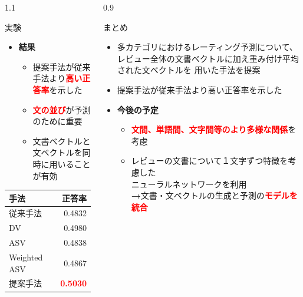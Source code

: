 \documentclass[unicode,10pt]{beamer}
\newlength{\mycolumnwidth}
\newcommand{\arrow}{\textcolor{ttiblue}{\textbf{→}}\hspace{1ex}}
\newcommand{\itemtitle}[1]{\textbf{#1}\\}
\newcommand{\fire}[1]{\textcolor{red}{\textbf{#1}}}
\newcommand{\doublecolumns}[4]{
    \begin{minipage}[t]{#1}
      #2
    \end{minipage}
    \begin{minipage}[t]{#3}
      #4
    \end{minipage}}
\begin{document}
\begin{frame}[t]
\begin{columns}[onlytextwidth,t]
\begin{column}{1.1\mycolumnwidth}
\begin{block}{実験}
      \doublecolumns{0.6\textwidth}{
        \begin{itemize}
          \item \itemtitle{結果}
            \begin{itemize}
              \item 提案手法が従来手法より\fire{高い正答率}を示した
              \item \fire{文の並び}が予測のために重要
              \item 文書ベクトルと文ベクトルを同時に用いることが有効
            \end{itemize}
        \end{itemize}
      }{0.375\textwidth}{
        \begin{table}
          \centering
          \begin{tabular}{l | r}
            手法 & 正答率 \\
            \hline
            従来手法\cite{fujitani15} & 0.4832 \\
            DV & 0.4980 \\
            ASV & 0.4838 \\
            Weighted ASV & 0.4867 \\
            提案手法 & \fire{0.5030} \\
          \end{tabular}
        \end{table}
      }
    \end{block}
  \end{column}

  \begin{column}{0.9\mycolumnwidth}
    \begin{block}{まとめ}
      \begin{itemize}
        \item 多カテゴリにおけるレーティング予測について、
              レビュー全体の文書ベクトルに加え重み付け平均された文ベクトルを
              用いた手法を提案
        \item 提案手法が従来手法\cite{fujitani15}より高い正答率を示した
        \item \itemtitle{今後の予定}
          \begin{itemize}
            \item \fire{文間、単語間、文字間等のより多様な関係}を考慮
            \item レビューの文書について１文字ずつ特徴を考慮した\\
                  ニューラルネットワークを利用 \\
                  \arrow 文書・文ベクトルの生成と予測の\fire{モデルを統合}
          \end{itemize}
      \end{itemize}
    \end{block}


\end{column}
\end{columns}
\end{frame}
\end{document}
